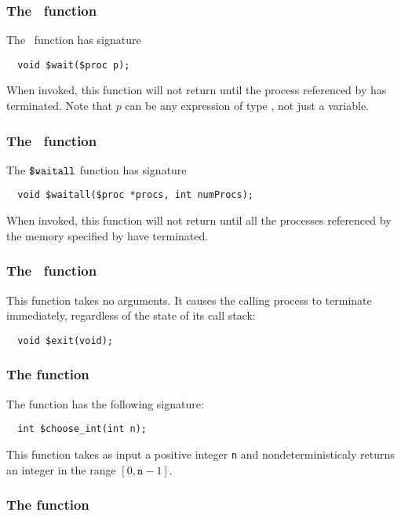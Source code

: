 \subsubsection{The \cwait\ function}
\label{subsubsec:wait}
The \cwait\ function has signature
\begin{verbatim}
  void $wait($proc p);
\end{verbatim}

When invoked, this function will not return until the process
referenced by  has terminated. Note that $p$ can be any
expression of type \cproc{}, not just a variable.

\subsubsection{The \cwaitall\ function}
\label{subsubsec:waitall}
The $\mbox{\texttt{\${}waitall}}$ function has signature
\begin{verbatim}
  void $waitall($proc *procs, int numProcs);
\end{verbatim}
When invoked, this function will not return until all the  processes
referenced by the memory specified by  have terminated.

\subsubsection{The \cexit\ function}
\label{subsubsec:exit}
This function takes no arguments.  It causes the
calling process to terminate immediately, regardless of the state of
its call stack:
\begin{verbatim}
  void $exit(void);
\end{verbatim}

\subsubsection{The \cchooseint{} function}
\label{subsubsec:chooseint}

The function \cchooseint{} has the following signature:
\begin{verbatim}
  int $choose_int(int n);
\end{verbatim}
This function takes as input a positive integer \texttt{n} and
nondeterministicaly returns an integer in the range
$[0,\texttt{n}-1]$.

\subsubsection{The \cscopedefined{} function}
\label{subsubsec:scopedefined}

